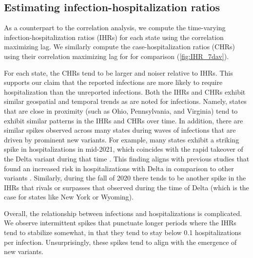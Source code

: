 \subsection{Estimating infection-hospitalization ratios}
\label{sec:ihrs}

As a counterpart to the correlation analysis, we compute the time-varying
infection-hospitalization ratios (IHRs) for each state using the correlation
maximizing lag. We similarly compute the case-hospitalization ratios (CHRs)
using their correlation maximizing lag for for comparison
(\autoref{fig:IHR_7dav}). 

For each state, the CHRs tend to be larger and noiser relative to
IHRs. This supports our claim that the reported infections are more
likely to require hospitalization than the unreported infections. Both the IHRs
and CHRs exhibit similar geospatial and temporal trends as are noted for
infections. Namely, states that are close in proximity (such as Ohio,
Pennsylvania, and Virginia) tend to exhibit similar patterns in the IHRs and
CHRs over time. In addition, there are similar spikes observed across many
states during waves of infections that are driven by prominent new variants. For
example, many states exhibit a striking spike in hospitalizations in mid-2021,
which coincides with the rapid takeover of the Delta variant during that time
\citep{hodcroft2021covariants}. This finding aligns with previous studies that
found an increased risk in hospitalizations with Delta in comparison to other
variants \citep{twohig2022hospital, nyberg2022comparative}. Similarly, during
the fall of 2020 there tends to be another spike in the IHRs that rivals or
surpasses that observed during the time of Delta (which is the case for states
like New York or Wyoming). 

Overall, the relationship between infections and hospitalizations is
complicated. We observe intermittent spikes that punctuate longer periods where
the IHRs tend to stabilize somewhat, in that they tend to stay below 0.1
hospitalizations per infection. Unsurprisingly, these spikes tend to align with
the emergence of new variants. 


